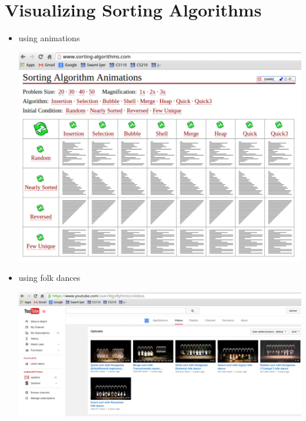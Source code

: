 \documentclass[8pt,a4paper,compress]{beamer}
\begin{document}
\section{Visualizing Sorting Algorithms}
\begin{frame}[fragile]
\begin{itemize}
\item using animations

\bigskip

\begin{center}
\includegraphics[scale=0.3]{./figures/algorithm_animations.pdf}
\end{center}
\end{itemize}
\end{frame}

\begin{frame}[fragile]
\begin{itemize}
\item using folk dances

\bigskip

\begin{center}
\includegraphics[scale=0.23]{./figures/algorithm_videos.pdf}
\end{center}
\end{itemize}
\end{frame}
\end{document}
